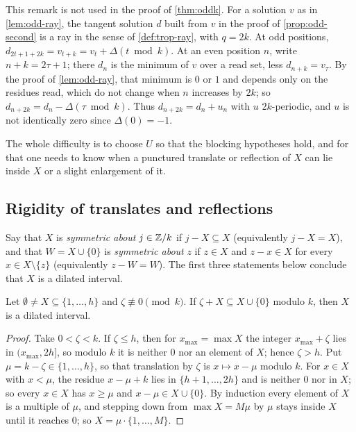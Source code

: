 \begin{remark}
\label{rem:odd-ray2k}
This remark is not used in the proof of \autoref{thm:oddk}. For a solution
$v$ as in \autoref{lem:odd-ray}, the tangent solution $d$ built from $v$ in
the proof of \autoref{prop:odd-second} is a ray in the sense of
\autoref{def:trop-ray}, with $q=2k$. At odd positions,
$d_{2t+1+2k}=v_{t+k}=v_t+\Delta(t\bmod k)$. At an even position $n$, write
$n+k=2\tau+1$; there $d_n$ is the minimum of $v$ over a read set, less
$d_{n+k}=v_\tau$. By the proof of \autoref{lem:odd-ray}, that minimum is $0$
or $1$ and depends only on the residues read, which do not change when $n$
increases by $2k$; so $d_{n+2k}=d_n-\Delta(\tau\bmod k)$. Thus
$d_{n+2k}=d_n+u_n$ with $u$ $2k$-periodic, and $u$ is not identically zero
since $\Delta(0)=-1$.
\end{remark}

The whole difficulty is to choose $U$ so that the blocking hypotheses hold,
and for that one needs to know when a punctured translate or reflection of $X$ can lie inside
$X$ or a slight enlargement of it.

\subsection{Rigidity of translates and reflections}
\label{sec:odd-rigid}

Say that $X$ is \emph{symmetric about} $j\in\mathbb{Z}/k$ if $j-X\subseteq X$
(equivalently $j-X=X$), and that $W=X\cup\{0\}$ is \emph{symmetric about}
$z$ if $z\in X$ and $z-x\in X$ for every $x\in X\setminus\{z\}$ (equivalently
$z-W=W$). The first three statements below conclude that $X$ is a dilated
interval.

\begin{lemma}
\label{lem:odd-trigid}
Let $\emptyset\ne X\subseteq\{1,\dots,h\}$ and $\zeta\not\equiv0\pmod k$.
If $\zeta+X\subseteq X\cup\{0\}$ modulo $k$, then $X$ is a dilated interval.
\end{lemma}

\begin{proof}
Take $0<\zeta<k$. If $\zeta\le h$, then for $x_{\max}=\max X$ the integer
$x_{\max}+\zeta$ lies in $(x_{\max},2h]$, so modulo $k$ it is neither $0$
nor an element of $X$; hence $\zeta>h$. Put $\mu=k-\zeta\in\{1,\dots,h\}$, so
that translation by $\zeta$ is $x\mapsto x-\mu$ modulo $k$. For $x\in X$ with
$x<\mu$, the residue $x-\mu+k$ lies in $\{h+1,\dots,2h\}$ and is neither $0$
nor in $X$; so every $x\in X$ has $x\ge\mu$ and $x-\mu\in X\cup\{0\}$. By
induction every element of $X$ is a multiple of $\mu$, and stepping down
from $\max X=M\mu$ by $\mu$ stays inside $X$ until it reaches $0$; so
$X=\mu\cdot\{1,\dots,M\}$.
\end{proof}

